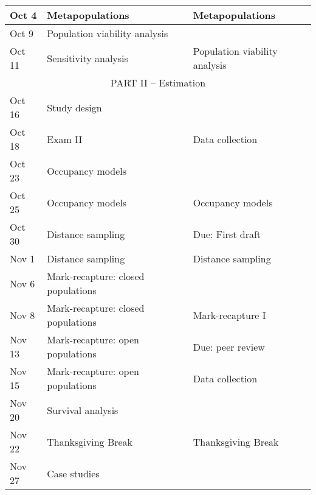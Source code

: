 \documentclass[12pt]{article}
\begin{document}
\begin{center}
\begin{tabular}[c]{lll}
Oct 4      & Metapopulations                    & Metapopulations                      \\
\hline
Oct 9     & Population viability analysis      &                                      \\
Oct 11     & Sensitivity analysis               & Population viability analysis        \\
\hline
           \multicolumn{3}{c}{PART II -- Estimation}                                   \\
\hline
Oct 16     & Study design                       &                                      \\
Oct 18     & Exam II                            & Data collection                      \\
\hline
Oct 23     & Occupancy models                   &                                      \\
Oct 25     & Occupancy models                   & Occupancy models                     \\
\hline
Oct 30     & Distance sampling                  & Due: First draft                     \\
Nov 1      & Distance sampling                  & Distance sampling                    \\
\hline
Nov 6      & Mark-recapture: closed populations &                                      \\
Nov 8      & Mark-recapture: closed populations & Mark-recapture I                     \\
\hline
Nov 13     & Mark-recapture: open populations   & Due: peer review                     \\
Nov 15     & Mark-recapture: open populations   & Data collection                      \\
\hline
Nov 20     & Survival analysis                  &                                      \\
Nov 22     & Thanksgiving Break                 & Thanksgiving Break                   \\
\hline
Nov 27     & Case studies                       &                                      \\

\end{tabular}
\end{center}
\end{document}

